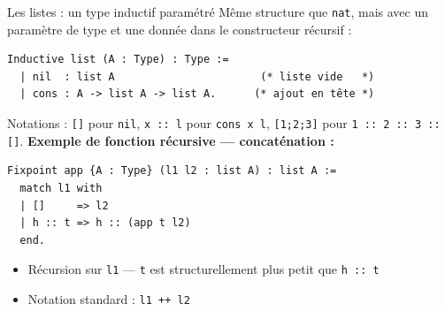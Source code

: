 \documentclass[aspectratio=169]{beamer}
\begin{document}
\begin{frame}[fragile]{Les listes : un type inductif paramétré}
  Même structure que \texttt{nat}, mais avec un paramètre de type et une donnée dans le constructeur récursif :

\begin{verbatim}
Inductive list (A : Type) : Type :=
  | nil  : list A                       (* liste vide   *)
  | cons : A -> list A -> list A.      (* ajout en tête *)
\end{verbatim}
  Notations : \texttt{[]} pour \texttt{nil}, \texttt{x :: l} pour \texttt{cons x l}, \texttt{[1;2;3]} pour \texttt{1 :: 2 :: 3 :: []}.
  \pause
  \medskip
  \textbf{Exemple de fonction récursive — concaténation :}
\begin{verbatim}
Fixpoint app {A : Type} (l1 l2 : list A) : list A :=
  match l1 with
  | []     => l2
  | h :: t => h :: (app t l2)
  end.
\end{verbatim}
  \begin{itemize}
    \item Récursion sur \texttt{l1} — \texttt{t} est structurellement plus petit que \texttt{h :: t}
    \item Notation standard : \texttt{l1 ++ l2}
  \end{itemize}
\end{frame}
\end{document}
